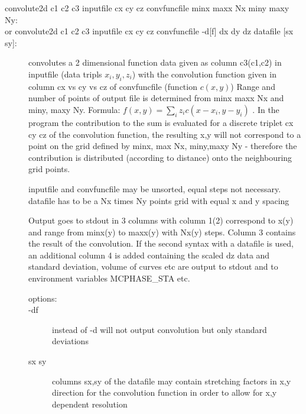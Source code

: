 \begin{description}
                       
\item [\prg convolute2d\label{convolute2d} c1 c2 c3 inputfile cx cy cz convfuncfile minx maxx Nx miny maxy Ny:] 
\item [or \prg convolute2d c1 c2 c3 inputfile cx cy cz convfuncfile {-d[f]} dx dy dz datafile {[sx sy]}:]  
convolutes a 2 dimensional function data given as column c3(c1,c2) in inputfile (data tripls $x_i,y_i, z_i$) with the 
                        convolution function given in column cx vs cy vs cz
		        of convfuncfile (function $c(x,y)$)
		       Range and number of points of output file is determined from minx maxx Nx and 
                        miny, maxy Ny.
			Formula: $f(x,y)=\sum_i z_i c(x-x_i,y-y_i)$ . In the program the contribution to
                        the sum is evaluated for a discrete triplet cx cy cz of the convolution function, the 
                        resulting x,y will not correspond to a point on the grid defined by minx, max Nx, miny,maxy Ny -
                        therefore the contribution is distributed (according to distance) onto the neighbouring grid
                       points.
 
{\prg inputfile} and {\prg convfuncfile} may be unsorted, equal steps not necessary.
 datafile has to be a Nx times Ny points grid with equal x and y spacing

 Output goes to stdout in 3 columns with
       column  1(2) correspond to x(y)  and range from minx(y) to maxx(y) with Nx(y) steps.
 Column 3 contains the result of the convolution.
       If the second syntax with a {\prg datafile}
 is used,  an additional column 4 is added containing the scaled dz data and
                 standard deviation, volume of curves etc are output to
                 stdout and to environment variables MCPHASE\_STA etc.
\begin{description}
 \item [options:]
  \item[-df ] instead of -d will not output convolution but only standard deviations
  \item[sx sy ] columns sx,sy of the datafile may contain 
                       stretching factors in x,y direction for the convolution function in 
                         order to allow for x,y dependent resolution
\end{description}


\end{description}
